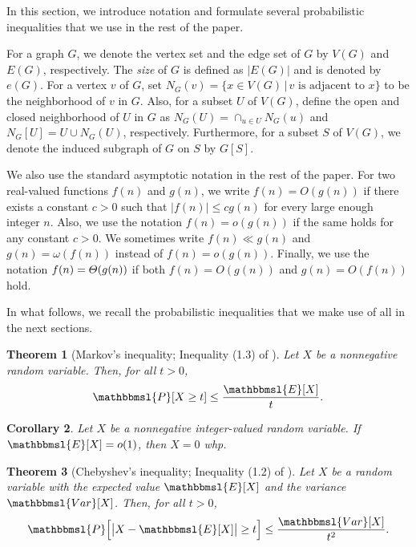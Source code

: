 \documentclass[hidelinks, 11pt]{article}
\theoremstyle{plain}
\newtheorem{theorem}{Theorem}[section]
\newtheorem{corollary}[theorem]{Corollary}
\theoremstyle{definition}
\begin{document}
In this section, we introduce notation  and formulate several probabilistic inequalities  that we use in the rest of the  paper.


For a graph $G$, we denote  the vertex set and the edge set of   $G$  by $V(G)$ and $E(G)$, respectively.
The  {\sl size} of $G$ is  defined as   $|E(G)|$ and is denoted by $e(G)$.
For a vertex $v$ of $G$, set $N_G(v)=\{x\in V(G) \, | \, v \text{  is adjacent to } x\}$ to be the neighborhood of   $v$ in $G$. Also, for a subset $U$ of $V(G)$, define the open and closed neighborhood of $U$ in $G$ as $N_G(U)=\cap_{u\in U} N_G(u)$  and $N_G[U]=U \cup N_G(U)$, respectively.
Furthermore, for  a subset $S$ of $V(G)$, we denote the induced subgraph of $G$ on $S$  by $G[S]$.


We also use the standard asymptotic notation in the rest of the paper. For two real-valued functions $f(n)$ and $g(n)$, we write $f(n)=O(g(n))$ if there exists a constant $c>0$   such that $|f(n)|\leq cg(n)$ for every   large enough integer $n$. Also, we use the notation  $f(n)=o(g(n))$ if the same holds for any constant $c>0$.    We sometimes  write    $f(n)\ll g(n)$  and   $g(n)=\omega(f(n))$ instead of   $f(n)=o(g(n))$. Finally, we use the notation   $f(n)=\mathnormal{\Theta}(g(n))$ if both   $f(n)=O(g(n))$ and $g(n)=O(f(n))$  hold.



In what follows, we   recall the  probabilistic inequalities that we make use of all in the  next sections.



\begin{theorem}[Markov's inequality;  Inequality (1.3)  of  \cite{RG}]\label{Markov}
Let   $X$ be a  nonnegative  random variable. Then,  for all  $t>0$,
$$\mathbbmsl{P}[X\geq t]\leq\frac{\mathbbmsl{E}[X]}{t}.$$
\end{theorem}



\begin{corollary}\label{First-Moment}
Let   $X$ be a   nonnegative  integer-valued       random variable. If   $\mathbbmsl{E}[X]=o(1)$, then $X=0$  whp.
\end{corollary}




\begin{theorem}[Chebyshev's inequality;  Inequality (1.2)  of  \cite{RG}]\label{chebyshev}
Let   $X$ be a  random variable with the expected value    $\mathbbmsl{E}[X]$ and   the variance  $\mathbbmsl{Var}[X]$. Then,  for all  $t>0$,
$$\mathbbmsl{P}\Big[\big|X-\mathbbmsl{E}[X]\big|\geq t\Big]\leq\frac{\mathbbmsl{Var}[X]}{t^2}.$$
\end{theorem}
\end{document}

